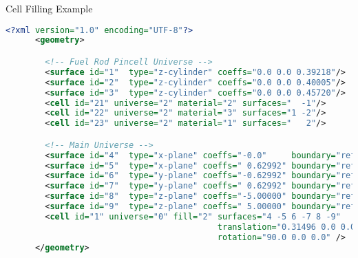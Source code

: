 
\begin{frame}[fragile]{Cell Filling Example}


  \begin{scriptsize}
    \begin{lstlisting}[language=XML,gobble=4]
      <?xml version="1.0" encoding="UTF-8"?>
      <geometry>

        <!-- Fuel Rod Pincell Universe -->
        <surface id="1"  type="z-cylinder" coeffs="0.0 0.0 0.39218"/>     <!-- fuel OR   -->
        <surface id="2"  type="z-cylinder" coeffs="0.0 0.0 0.40005"/>     <!-- gap OR    -->
        <surface id="3"  type="z-cylinder" coeffs="0.0 0.0 0.45720"/>     <!-- clad OR   -->
        <cell id="21" universe="2" material="2" surfaces="  -1"/>         <!-- fuel  -->
        <cell id="22" universe="2" material="3" surfaces="1 -2"/>         <!-- clad  -->
        <cell id="23" universe="2" material="1" surfaces="   2"/>         <!-- water -->

        <!-- Main Universe -->
        <surface id="4"  type="x-plane" coeffs="-0.0"     boundary="reflective"/>
        <surface id="5"  type="x-plane" coeffs=" 0.62992" boundary="reflective"/>
        <surface id="6"  type="y-plane" coeffs="-0.62992" boundary="reflective"/>
        <surface id="7"  type="y-plane" coeffs=" 0.62992" boundary="reflective"/>
        <surface id="8"  type="z-plane" coeffs="-5.00000" boundary="reflective"/>
        <surface id="9"  type="z-plane" coeffs=" 5.00000" boundary="reflective"/>
        <cell id="1" universe="0" fill="2" surfaces="4 -5 6 -7 8 -9"
                                           translation="0.31496 0.0 0.0"
                                           rotation="90.0 0.0 0.0" />
      </geometry>
    \end{lstlisting}
  \end{scriptsize}

  \centering

\end{frame}
